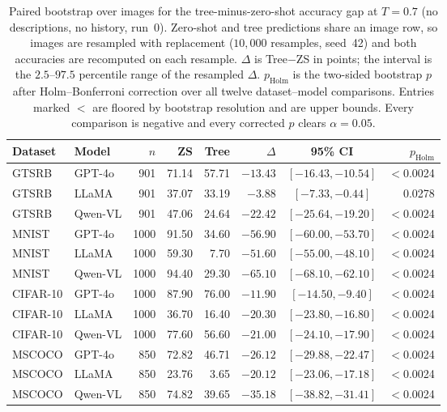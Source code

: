 \documentclass[10pt,twocolumn,letterpaper]{article}
\begin{document}
\begin{table}[t]
\centering
\caption{Paired bootstrap over images for the tree-minus-zero-shot accuracy gap at $T{=}0.7$ (no descriptions, no history, run~0). Zero-shot and tree predictions share an image row, so images are resampled with replacement ($10{,}000$ resamples, seed~42) and both accuracies are recomputed on each resample. $\Delta$ is Tree$-$ZS in points; the interval is the $2.5$--$97.5$ percentile range of the resampled $\Delta$. $p_{\text{Holm}}$ is the two-sided bootstrap $p$ after Holm--Bonferroni correction over all twelve dataset--model comparisons. Entries marked $<$ are floored by bootstrap resolution and are upper bounds. Every comparison is negative and every corrected $p$ clears $\alpha=0.05$.}
\label{tab:supp_bootstrap}
\footnotesize
\setlength{\tabcolsep}{5pt}
\begin{tabular}{@{}llrrrrcr@{}}
\toprule
\textbf{Dataset} & \textbf{Model} & $n$ & \textbf{ZS} & \textbf{Tree} & $\Delta$ & \textbf{95\% CI} & $p_{\text{Holm}}$ \\
\midrule
GTSRB & GPT-4o & 901 & 71.14 & 57.71 & $-13.43$ & $[-16.43, -10.54]$ & $<$0.0024 \\
GTSRB & LLaMA & 901 & 37.07 & 33.19 & $-3.88$ & $[-7.33, -0.44]$ & 0.0278 \\
GTSRB & Qwen-VL & 901 & 47.06 & 24.64 & $-22.42$ & $[-25.64, -19.20]$ & $<$0.0024 \\
\midrule
MNIST & GPT-4o & 1000 & 91.50 & 34.60 & $-56.90$ & $[-60.00, -53.70]$ & $<$0.0024 \\
MNIST & LLaMA & 1000 & 59.30 & 7.70 & $-51.60$ & $[-55.00, -48.10]$ & $<$0.0024 \\
MNIST & Qwen-VL & 1000 & 94.40 & 29.30 & $-65.10$ & $[-68.10, -62.10]$ & $<$0.0024 \\
\midrule
CIFAR-10 & GPT-4o & 1000 & 87.90 & 76.00 & $-11.90$ & $[-14.50, -9.40]$ & $<$0.0024 \\
CIFAR-10 & LLaMA & 1000 & 36.70 & 16.40 & $-20.30$ & $[-23.80, -16.80]$ & $<$0.0024 \\
CIFAR-10 & Qwen-VL & 1000 & 77.60 & 56.60 & $-21.00$ & $[-24.10, -17.90]$ & $<$0.0024 \\
\midrule
MSCOCO & GPT-4o & 850 & 72.82 & 46.71 & $-26.12$ & $[-29.88, -22.47]$ & $<$0.0024 \\
MSCOCO & LLaMA & 850 & 23.76 & 3.65 & $-20.12$ & $[-23.06, -17.18]$ & $<$0.0024 \\
MSCOCO & Qwen-VL & 850 & 74.82 & 39.65 & $-35.18$ & $[-38.82, -31.41]$ & $<$0.0024 \\
\bottomrule
\end{tabular}
\end{table}
\end{document}
